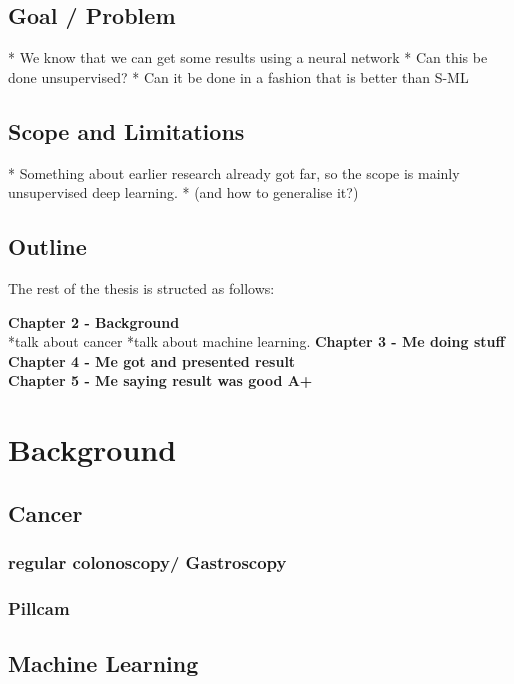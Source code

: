 \documentclass[a4paper,english]{ifimaster}
\begin{document}
	\section{Goal / Problem}
		* We know that we can get some results using a neural network
		* Can this be done unsupervised?
		* Can it be done in a fashion that is better than S-ML
		 
		
		
	\section{Scope and Limitations}
		* Something about earlier research already got far, so the scope is mainly unsupervised deep learning.
		* (and how to generalise it?)
		
	
		

	\section{Outline}
	The rest of the thesis is structed as follows:
	
	\textbf{Chapter 2 - Background}\\
	*talk about cancer
	*talk about machine learning.
	\textbf{Chapter 3 - Me doing stuff}\\
	\textbf{Chapter 4 - Me got and presented result}\\
	\textbf{Chapter 5 - Me saying result was good A+}\\
	
		
\chapter{Background}
	\section{Cancer}
	  \subsection{regular colonoscopy/ Gastroscopy}
	  \subsection{Pillcam}
	  
	  
	\section{Machine Learning}
\end{document}

